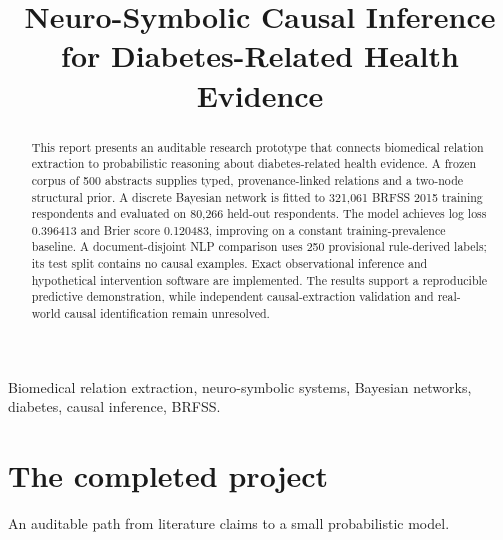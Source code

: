 \documentclass[conference]{IEEEtran}
\begin{document}
\raggedbottom
\title{Neuro-Symbolic Causal Inference for Diabetes-Related Health Evidence}
\author{
}
\maketitle
\begin{abstract}
This report presents an auditable research prototype that connects biomedical relation extraction to probabilistic reasoning about diabetes-related health evidence. A frozen corpus of 500 abstracts supplies typed, provenance-linked relations and a two-node structural prior. A discrete Bayesian network is fitted to 321,061 BRFSS 2015 training respondents and evaluated on 80,266 held-out respondents. The model achieves log loss 0.396413 and Brier score 0.120483, improving on a constant training-prevalence baseline. A document-disjoint NLP comparison uses 250 provisional rule-derived labels; its test split contains no causal examples. Exact observational inference and hypothetical intervention software are implemented. The results support a reproducible predictive demonstration, while independent causal-extraction validation and real-world causal identification remain unresolved.
\end{abstract}
\begin{IEEEkeywords}
Biomedical relation extraction, neuro-symbolic systems, Bayesian networks, diabetes, causal inference, BRFSS.
\end{IEEEkeywords}
\section{The completed project}
An auditable path from literature claims to a small probabilistic model.
\end{document}
